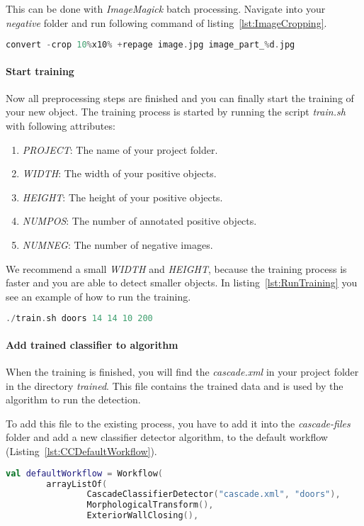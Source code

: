 This can be done with \textit{ImageMagick} batch processing. Navigate into your \textit{negative} folder and run following command of listing~\ref{lst:ImageCropping}.

\begin{lstlisting}[caption={Image cropping.}, label={lst:ImageCropping}, language=Kotlin, escapechar=$]
convert -crop 10%x10% +repage image.jpg image_part_%d.jpg
\end{lstlisting}

\paragraph{Start training}
Now all preprocessing steps are finished and you can finally start the training of your new object. The training process is started by running the script \textit{train.sh} with following attributes:

\begin{enumerate}
    \item \textit{PROJECT}: The name of your project folder.
    \item \textit{WIDTH}: The width of your positive objects.
    \item \textit{HEIGHT}: The height of your positive objects.
    \item \textit{NUMPOS}: The number of annotated positive objects.
    \item \textit{NUMNEG}: The number of negative images.
\end{enumerate}

We recommend a small \textit{WIDTH} and \textit{HEIGHT}, because the training process is faster and you are able to detect smaller objects. In listing~\ref{lst:RunTraining} you see an example of how to run the training.

\begin{lstlisting}[caption={Run training.}, label={lst:RunTraining}, language=Kotlin, escapechar=$]
./train.sh doors 14 14 10 200
\end{lstlisting}

\paragraph{Add trained classifier to algorithm}
When the training is finished, you will find the \textit{cascade.xml} in your project folder in the directory \textit{trained}. This file contains the trained data and is used by the algorithm to run the detection.

To add this file to the existing process, you have to add it into the \textit{cascade-files} folder and add a new classifier detector algorithm, to the default workflow (Listing~\ref{lst:CCDefaultWorkflow}).

\begin{lstlisting}[caption={New classifier in default worfklow.}, label={lst:CCDefaultWorkflow}, language=Kotlin, escapechar=$]
val defaultWorkflow = Workflow(
        arrayListOf(
                CascadeClassifierDetector("cascade.xml", "doors"),
                MorphologicalTransform(),
                ExteriorWallClosing(),
\end{lstlisting}